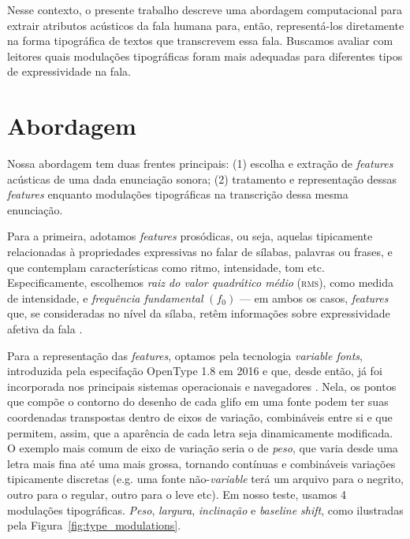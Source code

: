 \documentclass[11pt]{article}
\begin{document}
  Nesse contexto, o presente trabalho descreve uma abordagem computacional para extrair atributos acústicos da fala humana para, então, representá-los diretamente na forma tipográfica de textos que transcrevem essa fala. Buscamos avaliar com leitores quais modulações tipográficas foram mais adequadas para diferentes tipos de expressividade na fala.

  \section{Abordagem}
  \label{sec:abordagem}
  
  Nossa abordagem tem duas frentes principais: (1) escolha e extração de {\itshape features} acústicas de uma dada enunciação sonora; (2) tratamento e representação dessas {\itshape features} enquanto modulações tipográficas na transcrição dessa mesma enunciação.
  
  Para a primeira, adotamos {\itshape features} prosódicas, ou seja, aquelas tipicamente relacionadas à propriedades expressivas no falar de sílabas, palavras ou frases, e que contemplam características como ritmo, intensidade, tom etc. Especificamente, escolhemos {\itshape raiz do valor quadrático médio} \textsc{(rms)}, como medida de intensidade, e {\itshape frequência fundamental} $(f_0)$ --- em ambos os casos, {\itshape features} que, se consideradas no nível da sílaba, retêm informações sobre expressividade afetiva da fala \cite{rao2010characterization}.
  
  Para a representação das {\itshape features}, optamos pela tecnologia {\itshape variable fonts}, introduzida pela especifação OpenType 1.8\cite{varfontssepcs} em 2016 e que, desde então, já foi incorporada nos principais sistemas operacionais e navegadores \cite{varfontossupport}. Nela, os pontos que compõe o contorno do desenho de cada glifo em uma fonte podem ter suas coordenadas transpostas dentro de eixos de variação, combináveis entre si e que permitem, assim, que a aparência de cada letra seja dinamicamente modificada. O exemplo mais comum de eixo de variação seria o de {\itshape peso}, que varia desde uma letra mais fina até uma mais grossa, tornando contínuas e combináveis variações tipicamente discretas (e.g. uma fonte não-{\itshape variable} terá um arquivo para o negrito, outro para o regular, outro para o leve etc). Em nosso teste, usamos 4 modulações tipográficas. {\itshape Peso}, {\itshape largura}, {\itshape inclinação} e {\itshape baseline shift}, como ilustradas pela Figura~\ref{fig:type_modulations}.
  
\end{document}

